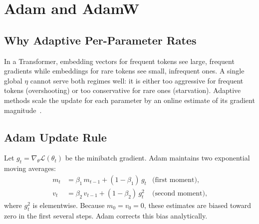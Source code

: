 \section{Adam and AdamW}

\subsection{Why Adaptive Per-Parameter Rates}

In a Transformer, embedding vectors for frequent tokens see large,
frequent gradients while embeddings for rare tokens see small, infrequent
ones. A single global $\eta$ cannot serve both regimes well: it is
either too aggressive for frequent tokens (overshooting) or too
conservative for rare ones (starvation). Adaptive methods scale the
update for each parameter by an online estimate of its gradient
magnitude~\citep{kingma2015adam}.

\subsection{Adam Update Rule}

Let $g_t = \nabla_\theta \mathcal{L}(\theta_t)$ be the minibatch
gradient. Adam maintains two exponential moving averages:
\begin{align}
m_t &= \beta_1\, m_{t-1} + (1-\beta_1)\, g_t
       & \text{(first moment)}, \label{eq:ch2-adam-m}\\
v_t &= \beta_2\, v_{t-1} + (1-\beta_2)\, g_t^2
       & \text{(second moment)},
\end{align}
where $g_t^2$ is elementwise. Because $m_0 = v_0 = 0$, these estimates
are biased toward zero in the first several steps. Adam corrects this
bias analytically.

